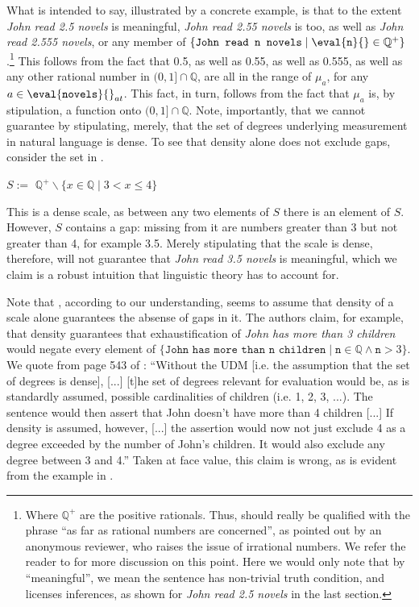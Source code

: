 \documentclass[output=paper]{langscibook}
\begin{document}
\noindent What  is intended to say, illustrated by a concrete example, is that to the extent \textit{John read 2.5 novels} is meaningful, \textit{John read 2.55 novels} is too, as well as \textit{John read 2.555 novels}, or any member of $\{\texttt{John read n novels} \mid \eval{\texttt{n}}{} \in \mathbb{Q}^+\}$.\footnote{Where $\mathbb{Q}^+$ are the positive rationals. Thus,  should really be qualified with the phrase ``as far as rational numbers are concerned'', as pointed out by an anonymous reviewer, who raises the issue of irrational numbers. We refer the reader to  for more discussion on this point. Here we would only note that by ``meaningful'', we mean the sentence has non-trivial truth condition, and licenses inferences, as shown for \textit{John read 2.5 novels} in the last section.} This follows from the fact that 0.5, as well as 0.55, as well as 0.555, as well as any other rational number in $(0,1] \cap\mathbb{Q}$, are all in the range of $\mu_a$, for any $a \in \eval{\texttt{novels}}{}_{at}$. This fact, in turn, follows from the fact that $\mu_a$ is, by stipulation, a function onto $(0,1] \cap\mathbb{Q}$. Note, importantly, that we cannot guarantee  by stipulating, merely, that the set of degrees underlying measurement in natural language is dense. To see that density alone does not exclude gaps, consider the set in .

\ea  
$S :=$ $\mathbb{Q}^+ \backslash \{x \in \mathbb{Q} \mid 3 < x \leq 4\}$
\label{hai-tri:dense+gap}
\z

\noindent This is a dense scale, as between any two elements of $S$ there is an element of $S$. However, $S$ contains a gap: missing from it are numbers greater than 3 but not greater than 4, for example 3.5. Merely stipulating that the scale is dense, therefore, will not guarantee that \textit{John read 3.5 novels} is meaningful, which we claim is a robust intuition that linguistic theory has to account for.

Note that \citet{foxhackl2006universal}, according to our understanding, seems to assume that density of a scale alone guarantees the absense of gaps in it. The authors claim, for example, that density guarantees that exhaustification of \textit{John has more than 3 children} would negate every element of $\{\texttt{John has more than n children} \mid \texttt{n} \in \mathbb{Q} \wedge \texttt{n} > 3\}$. We quote from page 543 of \citet{foxhackl2006universal}: ``Without the UDM [i.e. the assumption that the set of degrees is dense], [...] [t]he set of degrees relevant for evaluation would be, as is standardly assumed, possible cardinalities of children (i.e. 1, 2, 3, ...). The sentence would then assert that John doesn't have more than 4 children [...] If density is assumed, however, [...] the assertion would now not just exclude 4 as a degree exceeded by the number of John’s children. It would also exclude any degree between 3 and 4.'' Taken at face value, this claim is wrong, as is evident from the example in . 
\end{document}
